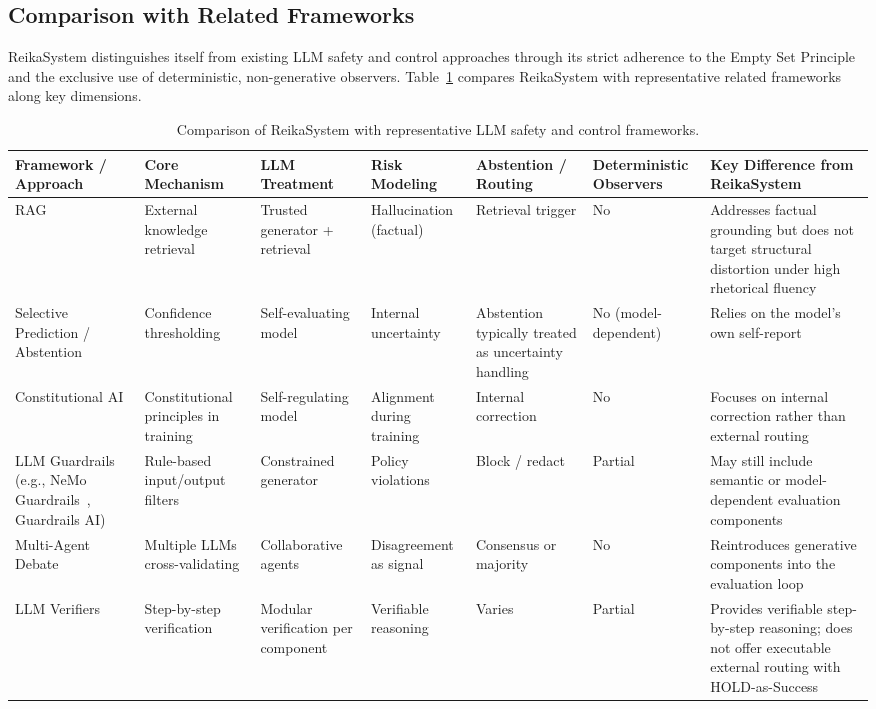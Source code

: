\documentclass[11pt,a4paper]{article}
\begin{document}
\subsection{Comparison with Related Frameworks}
\label{sec:related_comparison}

ReikaSystem distinguishes itself from existing LLM safety and control approaches
through its strict adherence to the Empty Set Principle and the exclusive use of
deterministic, non-generative observers. Table~\ref{tab:related_frameworks}
compares ReikaSystem with representative related frameworks along key dimensions.

\begin{table}[t]
\centering
\caption{Comparison of ReikaSystem with representative LLM safety and control frameworks.}
\label{tab:related_frameworks}
\begin{tabular}{p{3.2cm} p{2.6cm} p{2.2cm} p{2.4cm} p{2.6cm} p{1.9cm} p{4.2cm}}
\toprule
\textbf{Framework / Approach} &
\textbf{Core Mechanism} &
\textbf{LLM Treatment} &
\textbf{Risk Modeling} &
\textbf{Abstention / Routing} &
\textbf{Deterministic Observers} &
\textbf{Key Difference from ReikaSystem} \\
\midrule
RAG~\cite{lewis2020rag}
&
External knowledge retrieval
&
Trusted generator + retrieval
&
Hallucination (factual)
&
Retrieval trigger
&
No
&
Addresses factual grounding but does not target structural distortion under high rhetorical fluency
\\

Selective Prediction / Abstention~\cite{geifman2017selective}
&
Confidence thresholding
&
Self-evaluating model
&
Internal uncertainty
&
Abstention typically treated as uncertainty handling
&
No (model-dependent)
&
Relies on the model's own self-report
\\

Constitutional AI~\cite{bai2022constitutional}
&
Constitutional principles in training
&
Self-regulating model
&
Alignment during training
&
Internal correction
&
No
&
Focuses on internal correction rather than external routing
\\

LLM Guardrails (e.g., NeMo Guardrails~\cite{rebedea2023nemo}, Guardrails AI)
&
Rule-based input/output filters
&
Constrained generator
&
Policy violations
&
Block / redact
&
Partial
&
May still include semantic or model-dependent evaluation components
\\

Multi-Agent Debate~\cite{du2023improving}
&
Multiple LLMs cross-validating
&
Collaborative agents
&
Disagreement as signal
&
Consensus or majority
&
No
&
Reintroduces generative components into the evaluation loop
\\

LLM Verifiers~\cite{cobbe2021verifiers}
&
Step-by-step verification
&
Modular verification per component
&
Verifiable reasoning
&
Varies
&
Partial
&
Provides verifiable step-by-step reasoning; does not offer executable external routing with HOLD-as-Success
\\
\bottomrule
\end{tabular}
\end{table}
\end{document}
